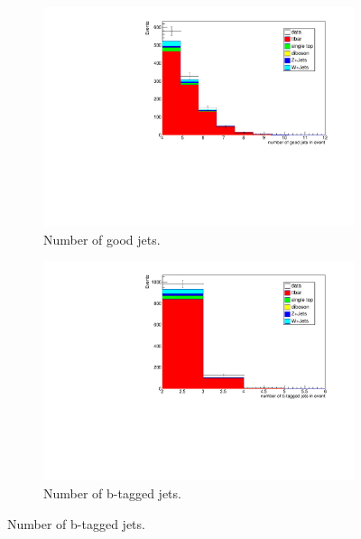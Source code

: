 \begin{figure}[H]
  \begin{subfigure}{0.45\textwidth}%
    \centering%
    \includegraphics[width=\textwidth]{plots/comparism/jet_goot.pdf}%
    \caption{Number of good jets.}%
    \label{fig:6c}%
  \end{subfigure}%
  \hfill
  \begin{subfigure}{0.45\textwidth}%
    \centering%
    \includegraphics[width=\textwidth]{plots/comparism/jet_b_tagged.pdf}%
    \caption{Number of b-tagged jets.}%
    \label{fig:6d}%
  \end{subfigure}%


\end{figure}
